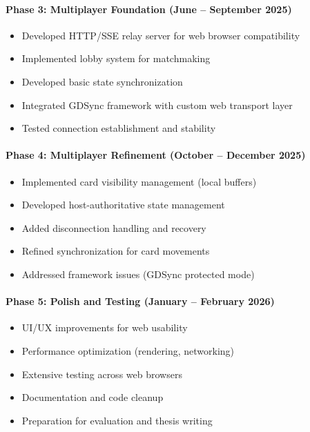 \paragraph*{Phase 3: Multiplayer Foundation (June -- September 2025)}
\begin{itemize}
    \item Developed HTTP/SSE relay server for web browser compatibility
    \item Implemented lobby system for matchmaking
    \item Developed basic state synchronization
    \item Integrated GDSync framework with custom web transport layer
    \item Tested connection establishment and stability
\end{itemize}

\paragraph*{Phase 4: Multiplayer Refinement (October -- December 2025)}
\begin{itemize}
    \item Implemented card visibility management (local buffers)
    \item Developed host-authoritative state management
    \item Added disconnection handling and recovery
    \item Refined synchronization for card movements
    \item Addressed framework issues (GDSync protected mode)
\end{itemize}

\paragraph*{Phase 5: Polish and Testing (January -- February 2026)}
\begin{itemize}
    \item UI/UX improvements for web usability
    \item Performance optimization (rendering, networking)
    \item Extensive testing across web browsers
    \item Documentation and code cleanup
    \item Preparation for evaluation and thesis writing
\end{itemize}

